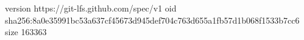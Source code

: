 version https://git-lfs.github.com/spec/v1
oid sha256:8a0e35991bc53a637cf45673d945def704c763d655a1fb57d1b068f1533b7cc6
size 163363
